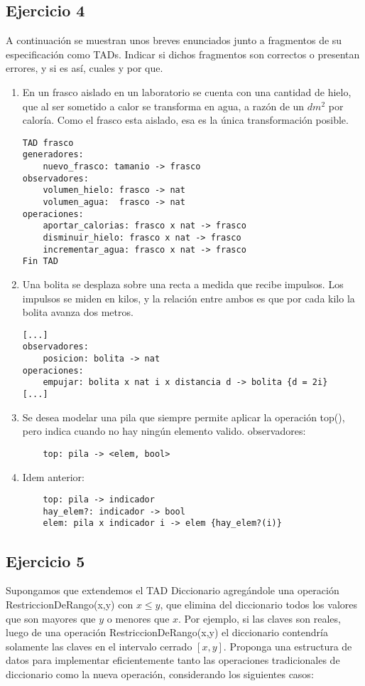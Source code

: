 \documentclass[10pt, a4paper]{article}
\begin{document}
\subsection*{Ejercicio 4} 
A continuaci\'on se muestran unos breves enunciados junto a fragmentos de su especificaci\'on como TADs. Indicar si dichos fragmentos son correctos o presentan errores, y si es as\'i, cuales y por que.

\begin{enumerate}
 \item En un frasco aislado en un laboratorio se cuenta con una cantidad de hielo, que al ser sometido a calor se transforma en agua, a raz\'on de un $dm^2$ por calor\'ia. Como el frasco esta aislado, esa es la \'unica transformaci\'on posible.

 \begin{verbatim}
TAD frasco
generadores:
    nuevo_frasco: tamanio -> frasco
observadores:
    volumen_hielo: frasco -> nat
    volumen_agua:  frasco -> nat
operaciones:
    aportar_calorias: frasco x nat -> frasco
    disminuir_hielo: frasco x nat -> frasco
    incrementar_agua: frasco x nat -> frasco
Fin TAD
\end{verbatim}

 \item Una bolita se desplaza sobre una recta a medida que recibe impulsos. Los impulsos se miden en kilos, y la relaci\'on entre ambos es que por cada kilo la bolita avanza dos metros.
\begin{verbatim}
[...]
observadores:
    posicion: bolita -> nat
operaciones:
    empujar: bolita x nat i x distancia d -> bolita {d = 2i}
[...]
\end{verbatim}


 \item Se desea modelar una pila que siempre permite aplicar la operaci\'on top(), pero indica cuando no hay ning\'un elemento valido.
observadores:
\begin{verbatim}
    top: pila -> <elem, bool>
\end{verbatim}

 \item Idem anterior:
\begin{verbatim}
    top: pila -> indicador
    hay_elem?: indicador -> bool
    elem: pila x indicador i -> elem {hay_elem?(i)}
\end{verbatim}

\end{enumerate}

\subsection*{Ejercicio 5}    
Supongamos que extendemos el TAD Diccionario agreg\'andole una operaci\'on RestriccionDeRango(x,y) con $x \leq y$, que elimina del diccionario todos los valores que son mayores que $y$ o menores que $x$. Por ejemplo, si las claves son reales, luego de una operaci\'on RestriccionDeRango(x,y) el diccionario contendr\'ia solamente las claves en el intervalo cerrado $[x, y]$. Proponga una estructura de datos para implementar eficientemente tanto las operaciones tradicionales de diccionario como la nueva operaci\'on, considerando los siguientes casos:
\end{document}

